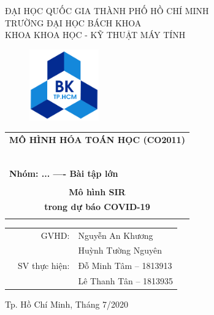 \documentclass[a4paper]{article}
\begin{document}
\begin{titlepage}
\begin{center}
ĐẠI HỌC QUỐC GIA THÀNH PHỐ HỒ CHÍ MINH \\
TRƯỜNG ĐẠI HỌC BÁCH KHOA \\
KHOA KHOA HỌC - KỸ THUẬT MÁY TÍNH 
\end{center}

\vspace{1cm}

\begin{figure}[h!]
\begin{center}
\includegraphics[width=3cm]{Images/hcmut.png}
\end{center}
\end{figure}

\vspace{1cm}


\begin{center}
\begin{tabular}{c}
\multicolumn{1}{l}{\textbf{{\Large MÔ HÌNH HÓA TOÁN HỌC (CO2011)}}}\\
~~\\
\hline
\\
\multicolumn{1}{l}{\textbf{{\Large Nhóm: ... ---- Bài tập lớn}}}\\
\\
\textbf{{\Huge Mô hình SIR}} \\
\textbf{{\Huge trong dự báo COVID-19}}\\
\\
\hline
\end{tabular}
\end{center}

\vspace{1.5cm}

\begin{table}[h]
\begin{tabular}{rrl}
\hspace{5 cm} & GVHD: & Nguyễn An Khương\\
\hspace{5 cm} &  & Huỳnh Tường Nguyên\\
& SV thực hiện: & Đỗ Minh Tâm -- 1813913 \\
& & Lê Thanh Tân -- 1813935\\

\end{tabular}
\end{table}
\vspace{1.5cm}
\begin{center}
{\footnotesize Tp. Hồ Chí Minh, Tháng 7/2020}
\end{center}
\end{titlepage}
\end{document}
